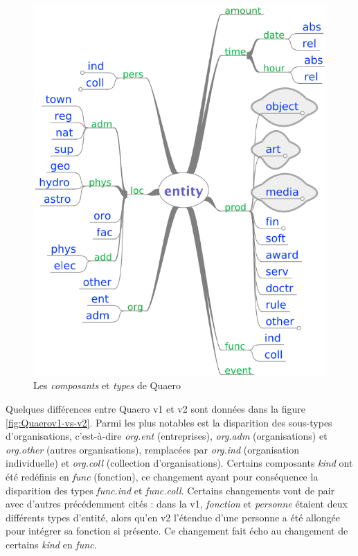 \documentclass[citation\_needed]{subfiles}
\begin{document}
\begin{figure}[ht!]
\begin{minipage}{0.49\linewidth}
   \includegraphics[scale=0.45]{images/quaero/annotation_guide-entities}
\end{minipage}
\caption{Les \emph{composants} et \emph{types} de Quaero}
\label{fig:quaero-components-entities}
\end{figure}

Quelques différences entre Quaero v1 et v2 sont données dans la figure \ref{fig:Quaerov1-vs-v2}. Parmi les plus notables est la disparition des sous-types d'organisations, c'est-à-dire \emph{org.ent} (entreprises), \emph{org.adm} (organisations) et \emph{org.other} (autres organisations), remplacées par \emph{org.ind} (organisation individuelle) et \emph{org.coll} (collection d'organisations). Certains composants \emph{kind} ont été redéfinis en \emph{func} (fonction), ce changement ayant pour conséquence la disparition des types \emph{func.ind} et \emph{func.coll}. Certains changements vont de pair avec d'autres précédemment cités : dans la v1, \emph{fonction} et \emph{personne} étaient deux différents types d'entité, alors qu'en v2 l'étendue d'une personne a été allongée pour intégrer sa fonction si présente. Ce changement fait écho au changement de certains \emph{kind} en \emph{func}.
\end{document}
